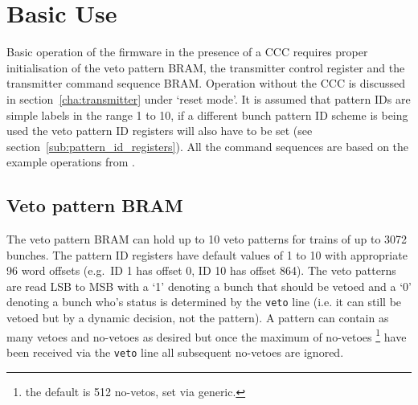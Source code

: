\ifpdf
{}
\else
{}
\fi

\chapter{Basic Use} %
\label{cha:basic_use}
Basic operation of the firmware in the presence of a CCC requires proper initialisation of the veto pattern BRAM, the transmitter control register and the transmitter command sequence BRAM. Operation without the CCC is discussed in section~\ref{cha:transmitter} under `reset mode'. It is assumed that pattern IDs are simple labels in the range 1 to 10, if a different bunch pattern ID scheme is being used the veto pattern ID registers will also have to be set (see section~\ref{sub:pattern_id_registers}). All the command sequences are based on the example operations from \cite{lpd_manual}.
    
\section{Veto pattern BRAM} %
\label{sub:basic_veto_pattern_bram}
The veto pattern BRAM can hold up to 10 veto patterns for trains of up to 3072 bunches. The pattern ID registers have default values of 1 to 10 with appropriate 96 word offsets (e.g.\ ID 1 has offset 0, ID 10 has offset 864). The veto patterns are read LSB to MSB with a `1' denoting a bunch that should be vetoed and a `0' denoting a bunch who's status is determined by the \texttt{veto} line (i.e. it can still be vetoed but by a dynamic decision, not the pattern). A pattern can contain as many vetoes and no-vetoes as desired but once the maximum of no-vetoes \footnote{the default is 512 no-vetos, set via generic.} have been received via the \texttt{veto} line all subsequent no-vetoes are ignored.
    
